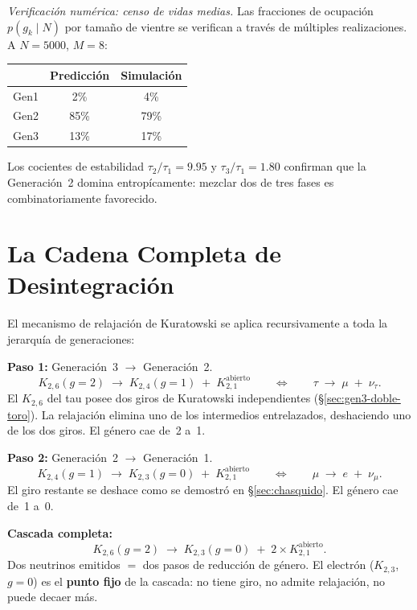 \documentclass[11pt, a4paper, openany]{book}
\begin{document}
\noindent\textit{Verificaci\'on num\'erica: censo de vidas medias.}\enspace
Las fracciones de ocupaci\'on $p(g_k \mid N)$ por tama\~no de vientre
se verifican a trav\'es de m\'ultiples realizaciones.
A $N = 5000$, $M = 8$:
\begin{center}
\renewcommand{\arraystretch}{1.2}
\begin{tabular}{lcc}
\toprule
& \textbf{Predicci\'on} & \textbf{Simulaci\'on} \\
\midrule
Gen1 & 2\% & 4\% \\
Gen2 & 85\% & 79\% \\
Gen3 & 13\% & 17\% \\
\bottomrule
\end{tabular}
\end{center}
Los cocientes de estabilidad $\tau_2/\tau_1 = 9{.}95$ y
$\tau_3/\tau_1 = 1{.}80$ confirman que la Generaci\'on~2 domina
entrop\'icamente: mezclar dos de tres fases es combinatoriamente
favorecido.

\section{La Cadena Completa de Desintegración}
\label{sec:cadena-completa}

El mecanismo de relajación de Kuratowski se aplica recursivamente a toda
la jerarquía de generaciones:

\medskip
\noindent
\textbf{Paso 1:} Generación~3 $\to$ Generación~2.
\[
  K_{2,6}(g = 2) \;\longrightarrow\; K_{2,4}(g = 1) \;+\; K_{2,1}^{\mathrm{abierto}}
  \qquad\Longleftrightarrow\qquad
  \tau \;\longrightarrow\; \mu \;+\; \nu_\tau.
\]
El $K_{2,6}$ del tau posee dos giros de Kuratowski independientes
(\S\ref{sec:gen3-doble-toro}). La relajación elimina uno de los
intermedios entrelazados, deshaciendo uno de los dos giros. El género
cae de~2 a~1.

\medskip
\noindent
\textbf{Paso 2:} Generación~2 $\to$ Generación~1.
\[
  K_{2,4}(g = 1) \;\longrightarrow\; K_{2,3}(g = 0) \;+\; K_{2,1}^{\mathrm{abierto}}
  \qquad\Longleftrightarrow\qquad
  \mu \;\longrightarrow\; e \;+\; \nu_\mu.
\]
El giro restante se deshace como se demostró en
\S\ref{sec:chasquido}. El género cae de~1 a~0.

\medskip
\noindent
\textbf{Cascada completa:}
\[
  K_{2,6}(g = 2) \;\longrightarrow\;
  K_{2,3}(g = 0) \;+\; 2 \times K_{2,1}^{\mathrm{abierto}}.
\]
Dos neutrinos emitidos $=$ dos pasos de reducción de género. El
electrón ($K_{2,3}$, $g = 0$) es el \textbf{punto fijo} de la
cascada: no tiene giro, no admite relajación, no puede decaer más.
\end{document}
